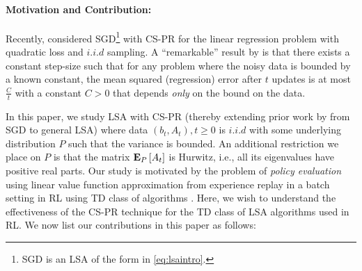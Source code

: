 \paragraph{Motivation and Contribution:} Recently, \citet{bach} considered SGD\footnote{SGD is an LSA of the form in \eqref{eq:lsaintro}.} with CS-PR for the linear regression problem with quadratic loss and $i.i.d$ sampling. A ``remarkable'' result by \citet{bach} is that there exists a constant step-size such that for any problem where the noisy data is bounded by a known constant, the mean squared (regression) error after $t$ updates is at most $\frac{C}{t}$ with a constant $C>0$ that depends \emph{only} on the bound on the data.\par{}
In this paper, we study LSA with CS-PR (thereby extending prior work by \citet{bach} from SGD to general LSA) where data $(b_t,A_t),t\geq 0$ is $i.i.d$ with some underlying distribution $P$ such that the variance is bounded. An additional restriction we place on $P$ is that the matrix $\mathbf{E}_P\left[A_t\right]$ is Hurwitz, i.e., all its eigenvalues have positive real parts.
Our study is motivated by the problem of \emph{policy evaluation} \cite{dann} using linear value function approximation from experience replay \cite{lin} in a batch setting \cite{lange} in RL using TD class  of algorithms \cite{sutton,konda-tsitsiklis,gtd,gtd2,gtdmp}. Here, we wish to understand the effectiveness of the CS-PR technique for the TD class of LSA algorithms used in RL.
We now list our contributions in this paper as follows:
